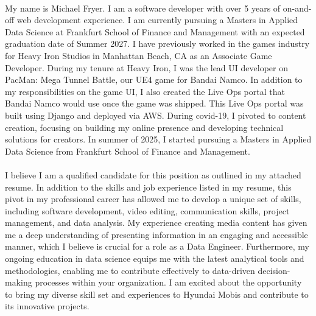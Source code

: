 \paragraph{}
My name is Michael Fryer. I am a software developer with over 5 years of on-and-off web development experience. I am currently pursuing a Masters in Applied Data Science at Frankfurt School of Finance and Management with an expected graduation date of Summer 2027. I have previously worked in the games industry for Heavy Iron Studios in Manhattan Beach, CA as an Associate Game Developer. During my tenure at Heavy Iron, I was the lead UI developer on PacMan: Mega Tunnel Battle, our UE4 game for Bandai Namco. In addition to my responsibilities on the game UI, I also created the Live Ops portal that Bandai Namco would use once the game was shipped. This Live Ops portal was built using Django and deployed via AWS\@. During covid-19, I pivoted to content creation, focusing on building my online presence and developing technical solutions for creators. In summer of 2025, I started pursuing a Masters in Applied Data Science from Frankfurt School of Finance and Management.

\paragraph{}
I believe I am a qualified candidate for this position as outlined in my attached resume. In addition to the skills and job experience listed in my resume, this pivot in my professional career has allowed me to develop a unique set of skills, including software development, video editing, communication skills, project management, and data analysis. My experience creating media content has given me a deep understanding of presenting information in an engaging and accessible manner, which I believe is crucial for a role as a Data Engineer. Furthermore, my ongoing education in data science equips me with the latest analytical tools and methodologies, enabling me to contribute effectively to data-driven decision-making processes within your organization. I am excited about the opportunity to bring my diverse skill set and experiences to Hyundai Mobis and contribute to its innovative projects.